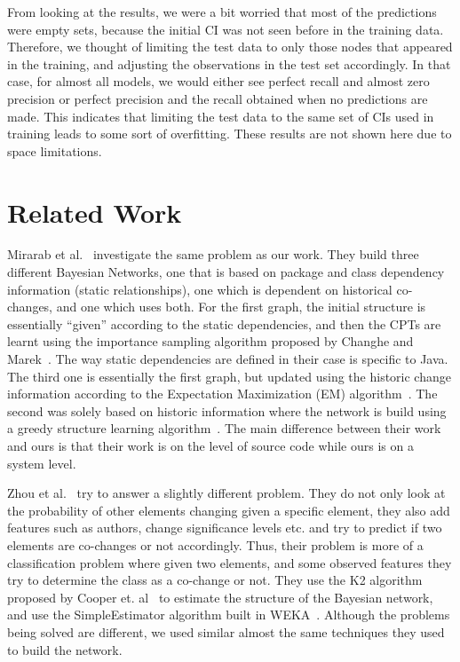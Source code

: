 \documentclass[10pt,twocolumn,letterpaper]{article}
\begin{document}
From looking at the results, we were a bit worried that most of the predictions were empty sets, because the initial CI was not seen before in the training
data. Therefore, we thought of limiting the test data to only those nodes that appeared in the training, and adjusting the observations in the test set
accordingly. In that case, for almost all models, we would either see perfect recall and almost zero precision or perfect precision and the recall obtained
when no predictions are made. This indicates that limiting the test data to the same set of CIs used in training leads to some sort
of overfitting. These results are not shown here due to space limitations.


\section{Related Work}
\label{rel-work}

Mirarab et al.~\cite{mirarab2007} investigate the same problem as our work. They build three
different Bayesian Networks, one that is based on package and class dependency information (static relationships), one which is dependent on historical
co-changes, and one which uses both. For the first graph, the initial structure is essentially ``given'' according to the static dependencies, and then the CPTs
are learnt using the importance sampling algorithm proposed by Changhe and Marek~\cite{yuan2003importance}. The way static dependencies are defined in their
case is specific to Java. The third one is essentially the first graph, but updated using the historic change information according to the Expectation
Maximization (EM) algorithm~\cite{dempster1977maximum}. The second was solely based on historic information where the network is build using a greedy structure
 learning algorithm~\cite{friedman1996learning}. The main difference between their work and ours is that their work is on the level of source
code while ours is on a system level.

Zhou et al.~\cite{zhou2008} try to answer a slightly different problem. They do not only look at the probability of other elements changing given a specific
element, they also add features such as authors, change significance levels etc. and try to predict if two elements are co-changes or not accordingly. Thus,
their problem is more of a classification problem where given two elements, and some observed features they try to determine the class as a co-change or not.
They use the K2 algorithm proposed by Cooper et. al~\cite{cooper1992bayesian} to estimate the structure of the Bayesian network, and use the SimpleEstimator
algorithm built in WEKA~\cite{witten2005data}. Although the problems being solved are different, we used similar almost the same techniques they used to build
the network.
\end{document}
